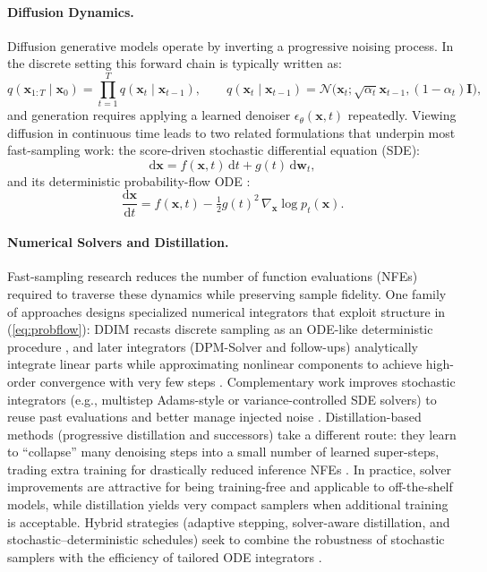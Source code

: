 \paragraph{Diffusion Dynamics.}
Diffusion generative models operate by inverting a progressive noising process. In the discrete setting this forward chain is typically written as:
\begin{equation}
\label{eq:forward_process}
q(\mathbf{x}_{1:T}\mid\mathbf{x}_0)=\prod_{t=1}^T q(\mathbf{x}_t\mid\mathbf{x}_{t-1}),\qquad
q(\mathbf{x}_t\mid\mathbf{x}_{t-1})=\mathcal{N}\!\big(\mathbf{x}_t;\sqrt{\alpha_t}\mathbf{x}_{t-1},(1-\alpha_t)\mathbf{I}\big),
\end{equation}
and generation requires applying a learned denoiser $\epsilon_\theta(\mathbf{x},t)$ repeatedly. Viewing diffusion in continuous time leads to two related formulations that underpin most fast-sampling work: the score-driven stochastic differential equation (SDE):
\begin{equation}
\mathrm{d}\mathbf{x}=f(\mathbf{x},t)\,\mathrm{d}t + g(t)\,\mathrm{d}\mathbf{w}_t,
\end{equation}
and its deterministic probability-flow ODE \citep{songDDIM}:
\begin{equation}
\frac{\mathrm{d}\mathbf{x}}{\mathrm{d}t}=f(\mathbf{x},t)-\tfrac{1}{2}g(t)^2\,\nabla_{\mathbf{x}}\log p_t(\mathbf{x}).
\label{eq:probflow}
\end{equation}

\paragraph{Numerical Solvers and Distillation.}
Fast-sampling research reduces the number of function evaluations (NFEs) required to traverse these dynamics while preserving sample fidelity. One family of approaches designs specialized numerical integrators that exploit structure in (\ref{eq:probflow}): DDIM recasts discrete sampling as an ODE-like deterministic procedure \citep{songDDIM}, and later integrators (DPM-Solver and follow-ups) analytically integrate linear parts while approximating nonlinear components to achieve high-order convergence with very few steps \citep{lu2022dpm,lu2022dpm++,zheng2023dpmsolvervF,zhang2022fast}. Complementary work improves stochastic integrators (e.g., multistep Adams-style or variance-controlled SDE solvers) to reuse past evaluations and better manage injected noise \citep{xue2024sa,guo2024gaussian,xu2023restart}. Distillation-based methods (progressive distillation and successors) take a different route: they learn to ``collapse'' many denoising steps into a small number of learned super-steps, trading extra training for drastically reduced inference NFEs \citep{salimans2022progressive,meng2022on,yin2024improved}. In practice, solver improvements are attractive for being training-free and applicable to off-the-shelf models, while distillation yields very compact samplers when additional training is acceptable. Hybrid strategies (adaptive stepping, solver-aware distillation, and stochastic–deterministic schedules) seek to combine the robustness of stochastic samplers with the efficiency of tailored ODE integrators \citep{jolicoeur2021gotta,liu2022pseudo,karras2022elucidating}.


